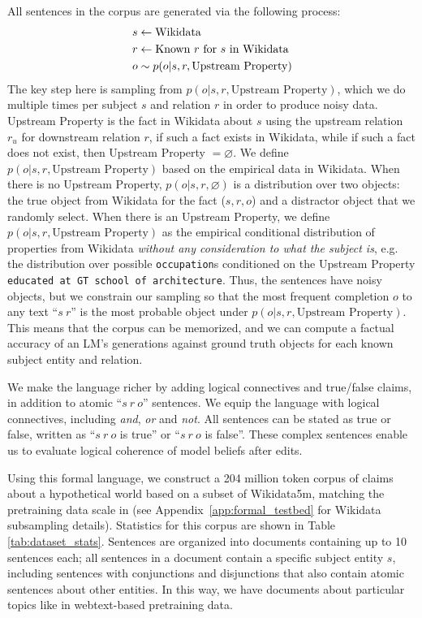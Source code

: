 \documentclass[11pt,a4paper]{article}
\begin{document}
All sentences in the corpus are generated via the following process:
\vspace{-5pt}
\begin{align*}
    & s \leftarrow \textrm{Wikidata} \\
    & r \leftarrow \textrm{Known $r$ for $s$ in Wikidata} \\ 
    & o \sim p(o|s,r, \textrm{Upstream Property})
    \vspace{-5pt}
\end{align*}
The key step here is sampling from $p(o|s,r, \textrm{Upstream Property})$, which we do multiple times per subject $s$ and relation $r$ in order to produce noisy data. 
Upstream Property is the fact in Wikidata about $s$ using the upstream relation $r_u$ for downstream relation $r$, if such a fact exists in Wikidata, while if such a fact does not exist, then Upstream Property $=\varnothing$.
We define $p(o|s,r, \textrm{Upstream Property})$ based on the empirical data in Wikidata.
When there is no Upstream Property, $p(o|s,r, \varnothing)$ is a distribution over two objects: the true object from Wikidata for the fact ($s, r, o$) and a distractor object that we randomly select. 
When there is an Upstream Property, we define $p(o|s,r, \textrm{Upstream Property})$ as the empirical conditional distribution of properties from Wikidata \emph{without any consideration to what the subject is}, e.g. the distribution over possible \texttt{occupation}s conditioned on the Upstream Property \texttt{educated at GT school of architecture}. 
Thus, the sentences have noisy objects, but we constrain our sampling so that the most frequent completion $o$ to any text ``$s \ r$'' is the most probable object under $p(o|s,r, \textrm{Upstream Property})$. This means that the corpus can be memorized, and we can compute a factual accuracy of an LM's generations against ground truth objects for each known subject entity and relation.

We make the language richer by adding logical connectives and true/false claims, in addition to atomic ``$s \ r \ o$'' sentences.
We equip the language with logical connectives, including \emph{and}, \emph{or} and \emph{not}. All sentences can be stated as true or false, written as ``$s \ r \ o$ is true'' or ``$s \ r \ o$ is false''. 
These complex sentences enable us to evaluate logical coherence of model beliefs after edits.

Using this formal language, we construct a 204 million token corpus of claims about a hypothetical world based on a subset of Wikidata5m, matching the pretraining data scale in \citep{prystawski2024think} (see Appendix~\ref{app:formal_testbed} for Wikidata subsampling details). 
Statistics for this corpus are shown in Table \ref{tab:dataset_stats}. 
Sentences are organized into documents containing up to 10 sentences each; all sentences in a document contain a specific subject entity $s$, including sentences with conjunctions and disjunctions that also contain atomic sentences about other entities. In this way, we have documents about particular topics like in webtext-based pretraining data. 
\end{document}
